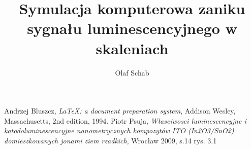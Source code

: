 \documentclass[a4paper,12pt,oneside]{book}
\title{Symulacja komputerowa zaniku sygnału luminescencyjnego w skaleniach}
\author{Olaf Schab}
\begin{document}







\begin{thebibliography}{wstep}

  Andrzej Bluszcz,
  \emph{\LaTeX: a document preparation system},
  Addison Wesley, Massachusetts,
  2nd edition,
  1994.
Piotr Psuja,
\emph{Własciwosci luminescencyjne i katodoluminescencyjne
nanometrycznych kompozytów ITO (In2O3/SnO2)
domieszkowanych jonami ziem rzadkich}, Wrocław 2009, s.14 rys. 3.1


\end{thebibliography}
\end{document}
